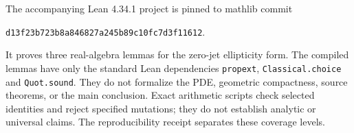 \documentclass[11pt]{article}
\theoremstyle{remark}\newtheorem{remark}[theorem]{Remark}
\begin{document}
The accompanying Lean 4.34.1 project is pinned to mathlib commit
\begin{center}\texttt{d13f23b723b8a846827a245b89c10fc7d3f11612}.\end{center}
It proves three
real-algebra lemmas for the zero-jet ellipticity form. The compiled
lemmas have only the standard Lean dependencies
\texttt{propext}, \texttt{Classical.choice} and \texttt{Quot.sound}.
They do not formalize the PDE, geometric compactness, source
theorems, or the main conclusion. Exact arithmetic scripts check
selected identities and reject specified mutations; they do not
establish analytic or universal claims. The reproducibility receipt
separates these coverage levels.

\appendix


\end{document}
